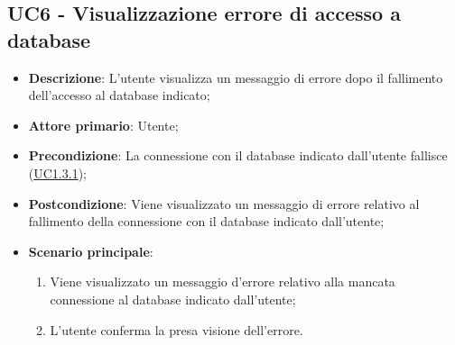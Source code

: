 \subsection{UC6 - Visualizzazione errore di accesso a database}
\label{sub:uc7}
\begin{itemize}
    \item \textbf{Descrizione}: L'utente visualizza un messaggio di errore dopo il fallimento dell'accesso
    al database indicato;

    \item \textbf{Attore primario}: Utente;
    
    \item \textbf{Precondizione}:   La connessione con il database indicato dall'utente fallisce 
    (\hyperref[par:uc1.3.1]{UC1.3.1});

    \item \textbf{Postcondizione}:  Viene visualizzato un messaggio di errore relativo al fallimento della connessione 
    con il database indicato dall'utente;

    \item \textbf{Scenario principale}:
    \begin{enumerate}
        \item Viene visualizzato un messaggio d'errore relativo alla mancata connessione al database indicato dall'utente;
        \item L'utente conferma la presa visione dell'errore.
    \end{enumerate}
\end{itemize}


\label{sub:uc8}


